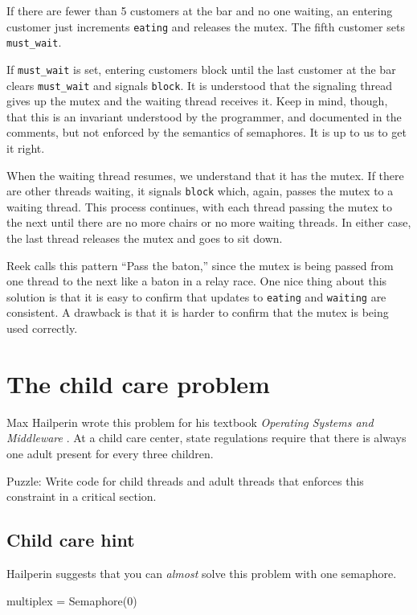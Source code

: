 \documentclass{book}
\begin{document}
If there are fewer than 5 customers at the bar and no one waiting, an
entering customer just increments {\tt eating} and releases the
mutex.  The fifth customer sets {\tt must\_wait}.

If {\tt must\_wait} is set, entering customers block until the last
customer at the bar clears {\tt must\_wait} and signals {\tt block}.
It is understood that the signaling thread gives up the mutex and the
waiting thread receives it.  Keep in mind, though, that this is an
invariant understood by the programmer, and documented in the
comments, but not enforced by the semantics of semaphores.  It is up
to us to get it right.

When the waiting thread resumes, we understand that it has
the mutex.  If there are other threads waiting,
it signals {\tt block} which, again,
passes the mutex to a waiting thread.  This process
continues, with each thread passing the mutex to the next until
there are no more chairs or no more waiting threads.  In either
case, the last thread releases the mutex and goes to sit down.

Reek calls this pattern ``Pass the baton,'' since the mutex
is being passed from one thread to the next like a baton in a
relay race.
One nice thing about this solution is that it is easy to confirm
that updates to {\tt eating} and {\tt waiting} are consistent.
A drawback is that it is harder to confirm that the mutex is
being used correctly.


% 
\section{The child care problem}

Max Hailperin wrote this problem for his textbook {\em Operating
        Systems and Middleware} \cite{hailperin}.  At a child care center,
state regulations require that there is always one adult present for
every three children.

Puzzle: Write code for child threads and adult threads that enforces
this constraint in a critical section.



\subsection {Child care hint}

Hailperin suggests that you can {\em almost} solve this problem
with one semaphore.

\begin{unbreakable}[title={Child care hint}]{}
multiplex = Semaphore(0)
\end{unbreakable}
\end{document}
